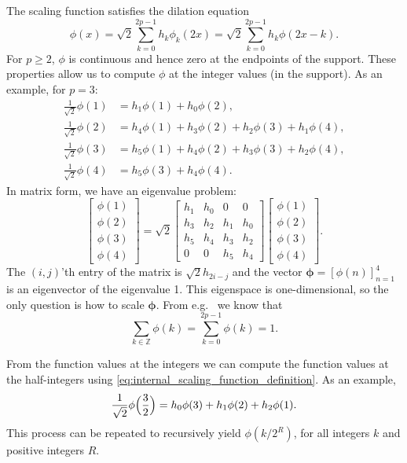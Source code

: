 \documentclass[a4paper]{scrartcl}
\newcommand{\vv}[1]{\ensuremath{\bm{#1}}}
\begin{document}
The scaling function satisfies the dilation equation
\begin{equation}
	\label{eq:internal_scaling_function_definition}
	\phi(x) 
	= \sqrt2 \sum_{k=0}^{2p-1} h_k \phi_k(2x)
	= \sqrt2 \sum_{k=0}^{2p-1} h_k \phi(2x - k).
\end{equation}
For $p\geq2$, $\phi$ is continuous and hence zero at the endpoints of the support.
These properties allow us to compute $\phi$ at the integer values (in the support).
As an example, for $p=3$:
\begin{align*}
	\frac1{\sqrt2} \phi(1) 
	& = h_1\phi(1) + h_0\phi(2),
	\\
	\frac1{\sqrt2} \phi(2)
	& = h_4\phi(1) + h_3\phi(2) + h_2\phi(3) + h_1\phi(4),
	\\
	\frac1{\sqrt2} \phi(3)
	& = h_5\phi(1) + h_4\phi(2) + h_3\phi(3) + h_2\phi(4),
	\\
	\frac1{\sqrt2} \phi(4)
	& = h_5\phi(3) + h_4\phi(4).
\end{align*}
In matrix form, we have an eigenvalue problem:
\begin{equation*}
	\begin{bmatrix}
		\phi(1) \\ \phi(2) \\ \phi(3) \\ \phi(4)
	\end{bmatrix}
	=
	\sqrt2
	\begin{bmatrix}
		h_1 & h_0 & 0 & 0
		\\
		h_3 & h_2 & h_1 & h_0
		\\
		h_5 & h_4 & h_3 & h_2
		\\
		0 & 0 & h_5 & h_4
	\end{bmatrix}
	\begin{bmatrix}
		\phi(1) \\ \phi(2) \\ \phi(3) \\ \phi(4)
	\end{bmatrix}.
\end{equation*}
The $(i,j)$'th entry of the matrix is $\sqrt2 h_{2i-j}$ and the vector $\vv\phi = [\phi(n)]_{n=1}^4$ is an eigenvector of the eigenvalue 1.
This eigenspace is one-dimensional, so the only question is how to scale $\vv\phi$.
From e.g.\ \cite[page 69]{Cohen:Daubechies:Vial:1993} we know that
\begin{equation*}
	\sum_{k\in\mathbb{Z}} \phi(k)
	= \sum_{k=0}^{2p-1} \phi(k)
	= 1.
\end{equation*}

From the function values at the integers we can compute the function values at the half-integers using \eqref{eq:internal_scaling_function_definition}.
As an example,
\begin{equation*}
	\frac1{\sqrt2} \phi\Bigl(\frac32\Bigr)
	= h_0 \phi(3) + h_1 \phi(2) + h_2 \phi(1).
\end{equation*}
This process can be repeated to recursively yield $\phi(k/2^R)$, for all integers $k$ and positive integers $R$.
\end{document}
